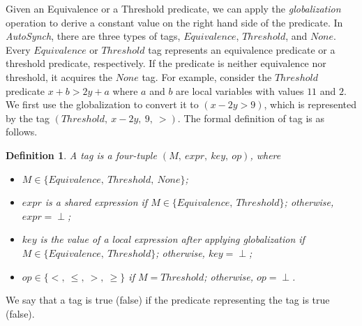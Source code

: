 \documentclass[preprint]{sigplanconf}
\newtheorem{definition}{Definition}
\begin{document}
Given an Equivalence or a Threshold predicate, we can apply the {\em globalization} operation 
to derive a constant value on the right hand side of the predicate. 
%
In {\em AutoSynch}, there are three types of tags, $Equivalence$, $Threshold$, and 
$None$. Every $Equivalence$ or $Threshold$ tag represents an equivalence predicate 
or a threshold predicate, respectively. 
If the predicate is neither equivalence nor threshold, it acquires the $None$
tag. For example, consider the $Threshold$ predicate $x + b > 2y + a$ where $a$ 
and $b$ are local variables with values $11$ and $2$.
We first use the globalization to convert it to $(x - 2y > 9)$, which is
represented by the tag $(Threshold,\ x - 2y,\ 9,\ >)$. The formal definition of
tag is as follows. 
\begin{definition}
   A tag is a four-tuple $(M,\ expr,\ key,\ op)$, where  
   \begin{itemize}
      \item $M \in \{Equivalence,\ Threshold,\ None\}$;
      \item $expr$ is a shared expression if 
          $M \in \{Equivalence,\ Threshold\}$; otherwise, $expr= \perp$;
      \item $key$ is the value of a local expression after applying
          globalization if $M \in \{Equivalence,\ Threshold\}$; otherwise, 
          $key= \perp$;
      \item $op \in \{<,\ \le,\ >,\ \ge\}$ if $M = Threshold$; otherwise, 
         $op = \perp$.
   \end{itemize}
\end{definition}
We say that a tag is true (false) if the predicate representing the tag is 
true (false).
 
\end{document}
